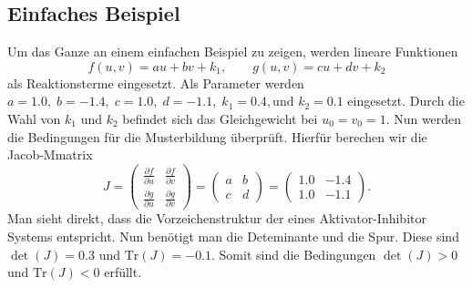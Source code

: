 \subsection{Einfaches Beispiel}
Um das Ganze an einem einfachen Beispiel zu zeigen, werden lineare Funktionen
\begin{equation}
f(u, v) = a u + b v + k_1, \qquad
g(u, v) = c u + d v + k_2
\label{reaktdiff:equ:ownreakterm}
\end{equation}
als Reaktionsterme eingesetzt.
Als Parameter werden \( a = 1.0,\; b = -1.4,\; c = 1.0,\; d = -1.1,\; k_1 = 0.4,\text{und }k_2 = 0.1 \) eingesetzt.
Durch die Wahl von \(k_1\) und \(k_2\) befindet sich das Gleichgewicht bei \(u_0 = v_0 = 1\).
Nun werden die Bedingungen für die Musterbildung überprüft.
Hierfür berechen wir die Jacob-Mmatrix
\begin{equation*}
        J =
        \begin{pmatrix}
        \frac{\partial f}{\partial u} & \frac{\partial f}{\partial v} \\
        \frac{\partial g}{\partial u} & \frac{\partial g}{\partial v}
        \end{pmatrix}
        =
        \begin{pmatrix}
        a & b \\
        c & d
        \end{pmatrix}
        =
        \begin{pmatrix}
        1.0 & -1.4 \\
        1.0 & -1.1
        \end{pmatrix}.
\end{equation*}
Man sieht direkt, dass die Vorzeichenstruktur der eines Aktivator-Inhibitor Systems entspricht.
Nun benötigt man die Deteminante und die Spur.
Diese sind \(\det(J) = 0.3\) und \(\text{Tr}(J) = -0.1\).
Somit sind die Bedingungen \(\det(J) > 0\) und \(\text{Tr}(J) <0\) erfüllt.


